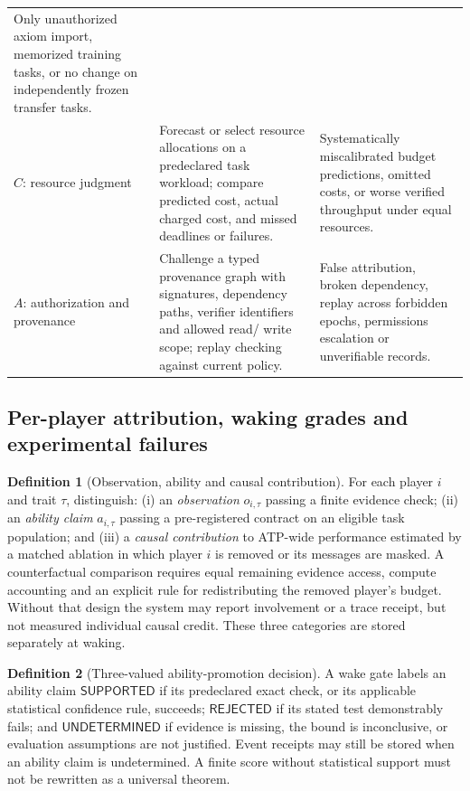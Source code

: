 \documentclass[11pt,letterpaper]{article}
\theoremstyle{definition}
\newtheorem{definition}{Definition}[section]
\theoremstyle{plain}
\theoremstyle{definition}
\begin{document}
\begin{longtable}{@{}p{.13\linewidth}p{.40\linewidth}p{.40\linewidth}@{}}
Only unauthorized axiom import, memorized training tasks, or no change
on independently frozen transfer tasks.\\[3pt]
$C$: resource judgment & Forecast or select resource allocations on a
predeclared task workload; compare predicted cost, actual charged cost,
and missed deadlines or failures. &
Systematically miscalibrated budget predictions, omitted costs, or
worse verified throughput under equal resources.\\[3pt]
$A$: authorization and provenance & Challenge a typed provenance graph
with signatures, dependency paths, verifier identifiers and allowed read/
write scope; replay checking against current policy. &
False attribution, broken dependency, replay across forbidden epochs,
permissions escalation or unverifiable records.\\
\bottomrule
\end{longtable}
\normalsize

\subsection{Per-player attribution, waking grades and experimental failures}
\begin{definition}[Observation, ability and causal contribution]
For each player $i$ and trait $\tau$, distinguish: (i) an
\emph{observation} $o_{i,\tau}$ passing a finite evidence check; (ii) an
\emph{ability claim} $a_{i,\tau}$ passing a pre-registered contract on an
eligible task population; and (iii) a \emph{causal contribution} to ATP-wide
performance estimated by a matched ablation in which player $i$ is removed
or its messages are masked. A counterfactual comparison requires equal
remaining evidence access, compute accounting and an explicit rule for
redistributing the removed player's budget. Without that design the system
may report involvement or a trace receipt, but not measured individual
causal credit. These three categories are stored separately at waking.
\end{definition}

\begin{definition}[Three-valued ability-promotion decision]
A wake gate labels an ability claim $\mathsf{SUPPORTED}$ if its
predeclared exact check, or its applicable statistical confidence rule,
succeeds; $\mathsf{REJECTED}$ if its stated test demonstrably fails; and
$\mathsf{UNDETERMINED}$ if evidence is missing, the bound is inconclusive,
or evaluation assumptions are not justified. Event receipts may still be
stored when an ability claim is undetermined. A finite score without
statistical support must not be rewritten as a universal theorem.
\end{definition}
\end{document}
